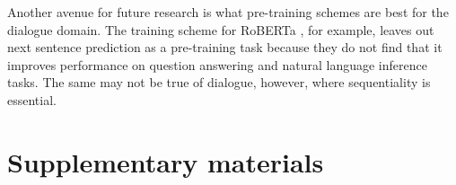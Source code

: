 \documentclass[11pt,a4paper]{article}
\begin{document}
Another avenue for future research is what pre-training schemes are best for the dialogue domain.
The training scheme for RoBERTa \citep{liuRoBERTaRobustlyOptimized2019}, for example, leaves out next sentence prediction as a pre-training task because they do not find that it improves performance on question answering and natural language inference tasks.
The same may not be true of dialogue, however, where sequentiality is essential.





\appendix
\onecolumn
\section{Supplementary materials}\label{sec:suppl}
\end{document}
